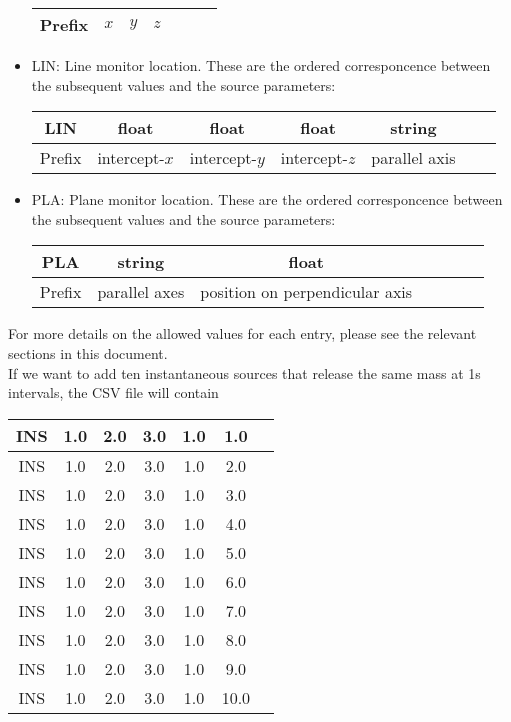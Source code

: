 \documentclass[]{article}
\begin{document}
\begin{itemize}
\begin{center}
\begin{tabular}{|c|c|c|c|c|c|c|}
            Prefix & $x$ & $y$ & $z$ & & & \\\hline
        \end{tabular}
    \end{center}
    \item LIN: Line monitor location. These are the ordered corresponcence
    between the subsequent values and the source parameters:
    \begin{center}
        \begin{tabular}{|c|c|c|c|c|c|c|}\hline
            LIN & float & float & float & string &  & \\\hline
            Prefix & intercept-$x$ & intercept-$y$ & intercept-$z$ & parallel axis & & \\\hline
        \end{tabular}
    \end{center}
    \item PLA: Plane monitor location. These are the ordered corresponcence
    between the subsequent values and the source parameters:
    \begin{center}
        \begin{tabular}{|c|c|c|c|c|c|c|}\hline
            PLA & string & float &  &  &  & \\\hline
            Prefix & parallel axes & position on perpendicular axis&  &  &  & \\\hline
        \end{tabular}
    \end{center}
\end{itemize}

For more details on the allowed values for each entry, please see the relevant
sections in this document.\\

\noindent If we want to add ten instantaneous sources that release the same mass
at 1s intervals, the CSV file will contain
\begin{center}
    \begin{tabular}{|c|c|c|c|c|c|c|}\hline
        INS & 1.0 & 2.0 & 3.0 & 1.0 & 1.0 & \\\hline
        INS & 1.0 & 2.0 & 3.0 & 1.0 & 2.0 & \\\hline
        INS & 1.0 & 2.0 & 3.0 & 1.0 & 3.0 & \\\hline
        INS & 1.0 & 2.0 & 3.0 & 1.0 & 4.0 & \\\hline
        INS & 1.0 & 2.0 & 3.0 & 1.0 & 5.0 & \\\hline
        INS & 1.0 & 2.0 & 3.0 & 1.0 & 6.0 & \\\hline
        INS & 1.0 & 2.0 & 3.0 & 1.0 & 7.0 & \\\hline
        INS & 1.0 & 2.0 & 3.0 & 1.0 & 8.0 & \\\hline
        INS & 1.0 & 2.0 & 3.0 & 1.0 & 9.0 & \\\hline
        INS & 1.0 & 2.0 & 3.0 & 1.0 & 10.0 & \\\hline
    \end{tabular}
\end{center}
\end{document}
